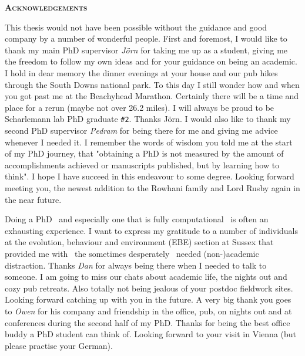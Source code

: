 \pagestyle{empty}%
%

\bigskip

\begin{center}
	\Huge \textsc{\textbf{Acknowledgements}}
\end{center}

This thesis would not have been possible without the guidance and good company by a number of wonderful people. First and foremost, I would like to thank my main PhD supervisor \textit{J\"{o}rn} for taking me up as a student, giving me the freedom to follow my own ideas and for your guidance on being an academic. I hold in dear memory the dinner evenings at your house and our pub hikes through the South Downs national park. To this day I still wonder how and when you got past me at the Beachyhead Marathon. Certainly there will be a time and place for a rerun (maybe not over 26.2 miles). I will always be proud to be Scharlemann lab PhD graduate \texttt{\#2}. Thanks J\"{o}rn.
I would also like to thank my second PhD supervisor \textit{Pedram} for being there for me and giving me advice whenever I needed it. I remember the words of wisdom you told me at the start of my PhD journey, that "obtaining a PhD is not measured by the amount of accomplishments achieved or manuscripts published, but by learning how to think". I hope I have succeed in this endeavour to some degree. Looking forward meeting you, the newest addition to the Rowhani family and Lord Rusby again in the near future. 

Doing a PhD \textendash\ and especially one that is fully computational \textendash\ is often an exhausting experience. I want to express my gratitude to a number of individuals at the evolution, behaviour and environment (EBE) section at Sussex that provided me with \textendash\ the sometimes desperately \textendash\ needed (non-)academic distraction. Thanks \textit{Dan} for always being there when I needed to talk to someone. I am going to miss our chats about academic life, the nights out and cozy pub retreats. Also totally not being jealous of your postdoc fieldwork sites. Looking forward catching up with you in the future. A very big thank you goes to \textit{Owen} for his company and friendship in the office, pub, on nights out and at conferences during the second half of my PhD. Thanks for being the best office buddy a PhD student can think of. Looking forward to your visit in Vienna (but please practise your German).

